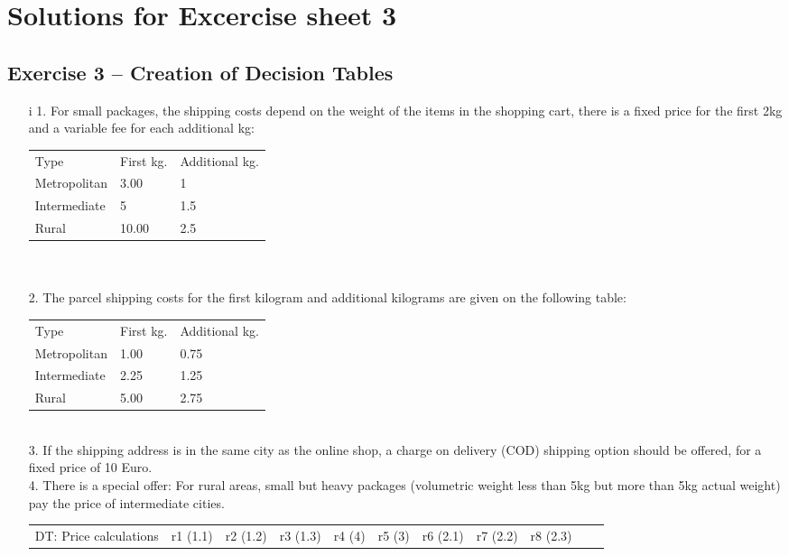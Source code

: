 \documentclass{scrartcl}
\begin{document}
\section*{Solutions for Excercise sheet 3}
\subsection*{Exercise 3 – Creation of Decision Tables}

\begin{itemize}
    \item[i]
    1. For small packages, the shipping costs depend on the weight of the items in the shopping cart, there is a fixed price for the first 2kg and a variable fee for each additional kg:\\
    \begin{tabular} {l l l}
    	Type & First kg. &     Additional kg.\\
    	Metropolitan &     3.00 &     1\\
    	Intermediate &     5 &     1.5\\
    	Rural &     10.00 &     2.5
    \end{tabular}\\\\
    2. The parcel shipping costs for the first kilogram and additional kilograms are given on the following
    table:\\
    \begin{tabular} {l l l}
	Type & First kg. &     Additional kg.\\
	Metropolitan &     1.00 &     0.75\\
	Intermediate &     2.25 &     1.25\\
	Rural &     5.00 &     2.75
    \end{tabular}\\
    3. If the shipping address is in the same city as the online shop, a charge on delivery (COD) shipping option should be offered, for a fixed price of 10 Euro.\\
    4. There is a special offer: For rural areas, small but heavy packages (volumetric weight less than 5kg but more than 5kg actual weight) pay the price of intermediate cities.\\
    \begin{adjustwidth}{-4em}{-4em}
    \begin{tabular}{|p{10em} || p{2.5em} | p{3em} | p{3em} | p{3em} | p{1em} | p{3em} | p{3em} | p{3em} | p{3em} | p{4em} |}
    	\hline
    	DT: Price calculations & r1 (1.1)& r2 (1.2)& r3 (1.3)& r4 (4)& r5 (3)& r6 (2.1)& r7 (2.2)& r8 (2.3)\\

\end{tabular}
\end{adjustwidth}
\end{itemize}
\end{document}
